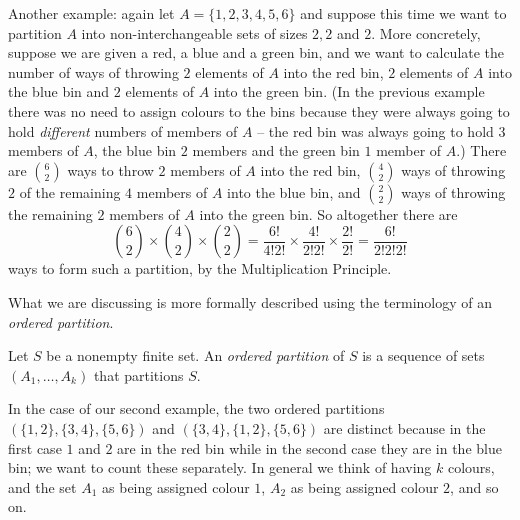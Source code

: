 \documentclass[11pt,dvipsnames]{book}
\numberwithin{figure}{section} %
\numberwithin{table}{section} %
\begin{document}
Another example: again let $A = \{1,2,3,4,5,6\}$ and suppose this time we want to partition $A$ into non-interchangeable sets of sizes
$2, 2$ and $2$. More concretely, suppose we are given a red, a blue and a green bin, and we want to calculate the number of ways of throwing $2$ elements of $A$ into the red bin, $2$ elements of $A$ into the blue bin  and $2$ elements of $A$ into the green bin. (In the previous example there was no need to assign colours to the bins because they were always going to hold {\em different} numbers of members of $A$ -- the red bin was always going to hold $3$ members of $A$, the blue bin $2$ members and the green bin $1$ member of $A$.) There are $6 \choose 2$ ways to throw $2$ members of $A$ into the red bin,  $4\choose2$ ways of throwing $2$ of the remaining $4$ members of $A$ into the blue bin, and $2 \choose 2$ ways of throwing the remaining $2$ members of $A$ into the green bin. So altogether there are
$$ {6 \choose 2} \times {4 \choose 2} \times {2 \choose 2}= \frac{6!}{4! 2!} \times \frac{4!}{2! 2!} \times \frac{2!}{2!} = \frac{6!}{2! 2! 2!}$$
ways to form such a partition, by the Multiplication Principle.

What we are discussing is more formally described using the terminology of an {\em ordered partition}.

\begin{definition}\label{part}
Let $S$ be a nonempty finite set.
An {\it ordered partition} of $S$ is a sequence of sets $(A_{1}, \dots ,A_{k})$ that partitions $S$.
\end{definition}

In the case of our second example, the two ordered partitions $(\{1,2\}, \{3,4\}, \{5,6\})$ and
 $(\{3,4\}, \{1,2\}, \{5,6\})$ are distinct because
 in the first case $1$ and $2$ are in the red bin while in the second case they are in the blue bin; we want to count these separately. In general we think of having $k$ colours, and the set $A_1$ as being assigned colour $1$, $A_2$ as being assigned colour $2$, and so on.


\end{document}
